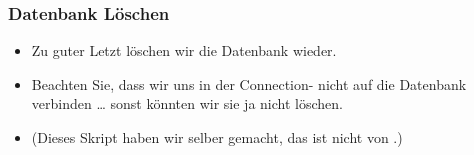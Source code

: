 \documentclass[aspectratio=169,mathserif,notheorems]{beamer}%
\begin{document}
%
%
\begin{frame}[t]%
\frametitle{Datenbank Löschen}%
\begin{itemize}%
\item Zu guter Letzt löschen wir die Datenbank wieder.%
\item<2-> Beachten Sie, dass wir uns in der Connection- nicht auf die Datenbank verbinden {\dots} sonst könnten wir sie ja nicht löschen.%
\item<3-> (Dieses Skript haben wir selber gemacht, das ist nicht von \pgmodeler.)
\end{itemize}%
%
%
%
\end{frame}%
%
\end{document}
